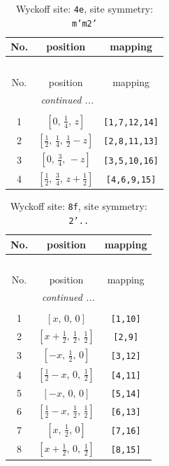 \documentclass[fleqn,8pt]{jsarticle}
\begin{document}
\renewcommand{\arraystretch}{1.2}
\begin{longtable}{ccc}
\caption{Wyckoff site: {\tt 4e}, site symmetry: {\tt m'm2'}}
 \\
 \hline \hline
No. & position & mapping \\ \hline \endfirsthead

\multicolumn{2}{l}{\tablename\ \thetable{}} \\
 \hline \hline
No. & position & mapping \\ \hline \endhead

 \hline \hline
\multicolumn{2}{r}{\footnotesize\it continued ...} \\ \endfoot

 \hline \hline
\multicolumn{2}{r}{} \\ \endlastfoot

1 & $\left[ 0,\, \frac{1}{4},\, z \right]$ & {\tt [1,7,12,14]} \\ \hline
2 & $\left[ \frac{1}{2},\, \frac{1}{4},\, \frac{1}{2} - z \right]$ & {\tt [2,8,11,13]} \\ \hline
3 & $\left[ 0,\, \frac{3}{4},\, - z \right]$ & {\tt [3,5,10,16]} \\ \hline
4 & $\left[ \frac{1}{2},\, \frac{3}{4},\, z + \frac{1}{2} \right]$ & {\tt [4,6,9,15]} \\
\end{longtable}
\renewcommand{\arraystretch}{1.2}
\begin{longtable}{ccc}
\caption{Wyckoff site: {\tt 8f}, site symmetry: {\tt 2'..}}
 \\
 \hline \hline
No. & position & mapping \\ \hline \endfirsthead

\multicolumn{2}{l}{\tablename\ \thetable{}} \\
 \hline \hline
No. & position & mapping \\ \hline \endhead

 \hline \hline
\multicolumn{2}{r}{\footnotesize\it continued ...} \\ \endfoot

 \hline \hline
\multicolumn{2}{r}{} \\ \endlastfoot

1 & $\left[ x,\, 0,\, 0 \right]$ & {\tt [1,10]} \\ \hline
2 & $\left[ x + \frac{1}{2},\, \frac{1}{2},\, \frac{1}{2} \right]$ & {\tt [2,9]} \\ \hline
3 & $\left[ - x,\, \frac{1}{2},\, 0 \right]$ & {\tt [3,12]} \\ \hline
4 & $\left[ \frac{1}{2} - x,\, 0,\, \frac{1}{2} \right]$ & {\tt [4,11]} \\ \hline
5 & $\left[ - x,\, 0,\, 0 \right]$ & {\tt [5,14]} \\ \hline
6 & $\left[ \frac{1}{2} - x,\, \frac{1}{2},\, \frac{1}{2} \right]$ & {\tt [6,13]} \\ \hline
7 & $\left[ x,\, \frac{1}{2},\, 0 \right]$ & {\tt [7,16]} \\ \hline
8 & $\left[ x + \frac{1}{2},\, 0,\, \frac{1}{2} \right]$ & {\tt [8,15]} \\
\end{longtable}
\end{document}
